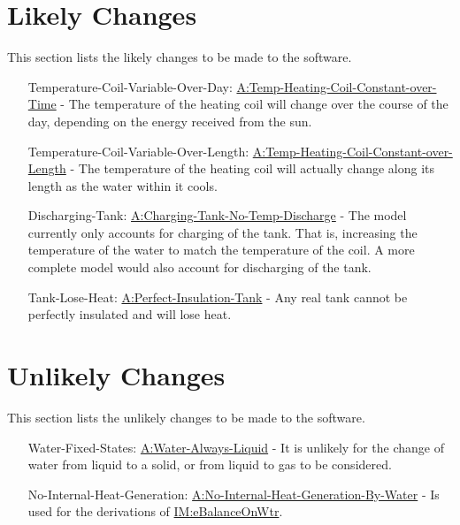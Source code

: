 \documentclass[12pt]{article}
\begin{document}
\section{Likely Changes}
\label{Sec:LCs}
This section lists the likely changes to be made to the software.

\begin{itemize}
\item[Temperature-Coil-Variable-Over-Day:\phantomsection\label{likeChgTCVOD}]{\hyperref[assumpTHCCoT]{A:Temp-Heating-Coil-Constant-over-Time} - The temperature of the heating coil will change over the course of the day, depending on the energy received from the sun.}
\item[Temperature-Coil-Variable-Over-Length:\phantomsection\label{likeChgTCVOL}]{\hyperref[assumpTHCCoL]{A:Temp-Heating-Coil-Constant-over-Length} - The temperature of the heating coil will actually change along its length as the water within it cools.}
\item[Discharging-Tank:\phantomsection\label{likeChgDT}]{\hyperref[assumpCTNTD]{A:Charging-Tank-No-Temp-Discharge} - The model currently only accounts for charging of the tank. That is, increasing the temperature of the water to match the temperature of the coil. A more complete model would also account for discharging of the tank.}
\item[Tank-Lose-Heat:\phantomsection\label{likeChgTLH}]{\hyperref[assumpPIT]{A:Perfect-Insulation-Tank} - Any real tank cannot be perfectly insulated and will lose heat.}
\end{itemize}
\section{Unlikely Changes}
\label{Sec:UCs}
This section lists the unlikely changes to be made to the software.

\begin{itemize}
\item[Water-Fixed-States:\phantomsection\label{unlikeChgWFS}]{\hyperref[assumpWAL]{A:Water-Always-Liquid} - It is unlikely for the change of water from liquid to a solid, or from liquid to gas to be considered.}
\item[No-Internal-Heat-Generation:\phantomsection\label{unlikeChgNIHG}]{\hyperref[assumpNIHGBW]{A:No-Internal-Heat-Generation-By-Water} - Is used for the derivations of \hyperref[IM:eBalanceOnWtr]{IM:eBalanceOnWtr}.}
\end{itemize}
\end{document}
